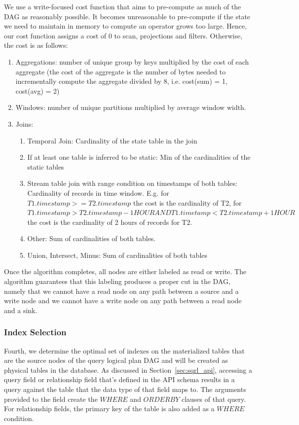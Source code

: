 \documentclass[	DIV=calc,%
							paper=letter,%
							fontsize=11pt,%
							twocolumn]{scrartcl}	 					%
\begin{document}
 We use a write-focused cost function that aims to pre-compute as much of the DAG as reasonably possible. It becomes unreasonable to pre-compute if the state we need to maintain in memory to compute an operator grows too large. Hence, our cost function assigns a cost of 0 to scan, projections and filters. Otherwise, the cost is as follows:
 \begin{enumerate}
     \item Aggregations: number of unique group by keys multiplied by the cost of each aggregate (the cost of the aggregate is the number of bytes needed to incrementally compute the aggregate divided by 8, i.e. cost(sum) = 1, cost(avg) = 2)
     \item Windows: number of unique partitions multiplied by average window width.
     \item Joins:
     \begin{enumerate}
         \item Temporal Join: Cardinality of the state table in the join
         \item If at least one table is inferred to be static: Min of the cardinalities of the static tables
         \item Stream table join with range condition on timestamps of both tables: Cardinality of records in time window. E.g. for $T1.timestamp >= T2.timestamp$ the cost is the cardinality of T2, for $T1.timestamp > T2.timestamp - 1 HOUR AND T1.timetamp < T2.timestamp + 1 HOUR$ the cost is the cardinality of 2 hours of records for T2.
         \item Other: Sum of cardinalities of both tables.
     \item Union, Intersect, Minus: Sum of cardinalities of both tables
     \end{enumerate}
 \end{enumerate}

Once the algorithm completes, all nodes are either labeled as read or write. The algorithm guarantees that this labeling produces a proper cut in the DAG, namely that we cannot have a read node on any path between a source and a write node and we cannot have a write node on any path between a read node and a sink.

\subsubsection{Index Selection}

Fourth, we determine the optimal set of indexes on the materialized tables that are the source nodes of the query logical plan DAG and will be created as physical tables in the database. As discussed in Section~\ref{sec:sqrl_api}, accessing a query field or relationship field that's defined in the API schema results in a query against the table that the data type of that field maps to. The arguments provided to the field create the $WHERE$ and $ORDER BY$ clauses of that query. For relationship fields, the primary key of the table is also added as a $WHERE$ condition.
\end{document}
